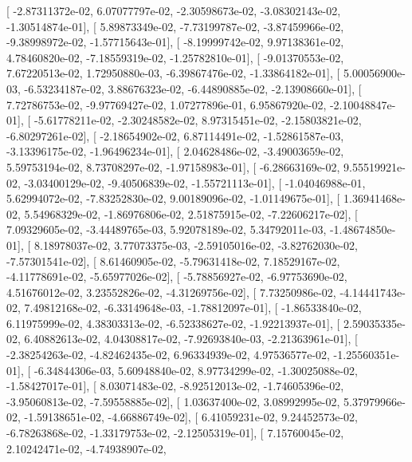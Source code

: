 \documentclass{article}
\begin{document}
       [ -2.87311372e-02,   6.07077797e-02,  -2.30598673e-02,
         -3.08302143e-02,  -1.30514874e-01],
       [  5.89873349e-02,  -7.73199787e-02,  -3.87459966e-02,
         -9.38998972e-02,  -1.57715643e-01],
       [ -8.19999742e-02,   9.97138361e-02,   4.78460820e-02,
         -7.18559319e-02,  -1.25782810e-01],
       [ -9.01370553e-02,   7.67220513e-02,   1.72950880e-03,
         -6.39867476e-02,  -1.33864182e-01],
       [  5.00056900e-03,  -6.53234187e-02,   3.88676323e-02,
         -6.44890885e-02,  -2.13908660e-01],
       [  7.72786753e-02,  -9.97769427e-02,   1.07277896e-01,
          6.95867920e-02,  -2.10048847e-01],
       [ -5.61778211e-02,  -2.30248582e-02,   8.97315451e-02,
         -2.15803821e-02,  -6.80297261e-02],
       [ -2.18654902e-02,   6.87114491e-02,  -1.52861587e-03,
         -3.13396175e-02,  -1.96496234e-01],
       [  2.04628486e-02,  -3.49003659e-02,   5.59753194e-02,
          8.73708297e-02,  -1.97158983e-01],
       [ -6.28663169e-02,   9.55519921e-02,  -3.03400129e-02,
         -9.40506839e-02,  -1.55721113e-01],
       [ -1.04046988e-01,   5.62994072e-02,  -7.83252830e-02,
          9.00189096e-02,  -1.01149675e-01],
       [  1.36941468e-02,   5.54968329e-02,  -1.86976806e-02,
          2.51875915e-02,  -7.22606217e-02],
       [  7.09329605e-02,  -3.44489765e-03,   5.92078189e-02,
          5.34792011e-03,  -1.48674850e-01],
       [  8.18978037e-02,   3.77073375e-03,  -2.59105016e-02,
         -3.82762030e-02,  -7.57301541e-02],
       [  8.61460905e-02,  -5.79631418e-02,   7.18529167e-02,
         -4.11778691e-02,  -5.65977026e-02],
       [ -5.78856927e-02,  -6.97753690e-02,   4.51676012e-02,
          3.23552826e-02,  -4.31269756e-02],
       [  7.73250986e-02,  -4.14441743e-02,   7.49812168e-02,
         -6.33149648e-03,  -1.78812097e-01],
       [ -1.86533840e-02,   6.11975999e-02,   4.38303313e-02,
         -6.52338627e-02,  -1.92213937e-01],
       [  2.59035335e-02,   6.40882613e-02,   4.04308817e-02,
         -7.92693840e-03,  -2.21363961e-01],
       [ -2.38254263e-02,  -4.82462435e-02,   6.96334939e-02,
          4.97536577e-02,  -1.25560351e-01],
       [ -6.34844306e-03,   5.60948840e-02,   8.97734299e-02,
         -1.30025088e-02,  -1.58427017e-01],
       [  8.03071483e-02,  -8.92512013e-02,  -1.74605396e-02,
         -3.95060813e-02,  -7.59558885e-02],
       [  1.03637400e-02,   3.08992995e-02,   5.37979966e-02,
         -1.59138651e-02,  -4.66886749e-02],
       [  6.41059231e-02,   9.24452573e-02,  -6.78263868e-02,
         -1.33179753e-02,  -2.12505319e-01],
       [  7.15760045e-02,   2.10242471e-02,  -4.74938907e-02,
\end{document}
